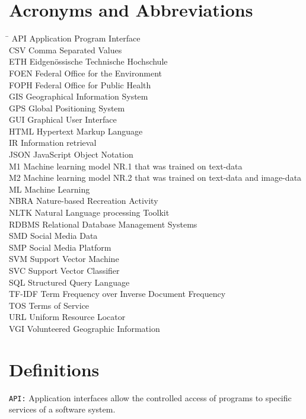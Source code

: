 \section*{Acronyms and Abbreviations}
\begin{tabbing}
 \hspace*{1.6cm}  \= \kill
 API \> Application Program Interface \\
 CSV \> Comma Separated Values \\
 ETH \> Eidgen\"{o}ssische Technische Hochschule \\
 FOEN \> Federal Office for the Environment \\
 FOPH \> Federal Office for Public Health \\
 GIS \> Geographical Information System \\
 GPS \> Global Positioning System \\
 GUI \> Graphical User Interface \\
 HTML \> Hypertext Markup Language \\
 IR \> Information retrieval \\
 JSON \> JavaScript Object Notation \\
 M1 \> Machine learning model NR.1 that was trained on text-data \\
 M2 \> Machine learning model NR.2 that was trained on text-data and image-data \\
 ML \> Machine Learning \\
 NBRA \> Nature-based Recreation Activity \\%
 NLTK \> Natural Language processing Toolkit \\ 
 RDBMS \> Relational Database Management Systems \\
 SMD \> Social Media Data \\
 SMP \> Social Media Platform \\
 SVM \> Support Vector Machine \\
 SVC \> Support Vector Classifier \\
 SQL \> Structured Query Language \\
 TF-IDF \> Term Frequency over Inverse Document Frequency \\
 TOS \> Terms of Service \\
 URL \> Uniform Resource Locator \\ 
 VGI \> Volunteered Geographic Information
\end{tabbing}

\section*{Definitions} \label{definitions}
\texttt{API:} Application interfaces allow the controlled access of programs to specific services of a software system. 
\newline

